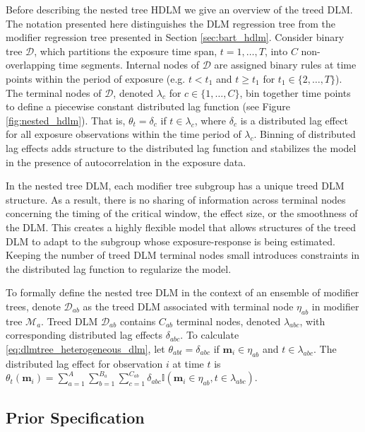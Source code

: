 \documentclass[12pt]{article}
\begin{document}
Before describing the nested tree HDLM we give an overview of the treed DLM. The notation presented here distinguishes the DLM regression tree from the modifier regression tree presented in Section \ref{sec:bart_hdlm}. Consider binary tree $\mathcal{D}$, which partitions the exposure time span, $t=1,\ldots,T$, into $C$ non-overlapping time segments. Internal nodes of $\mathcal{D}$ are assigned binary rules at time points within the period of exposure (e.g. $t<t_1$ and $t\geq t_1$ for $t_1\in\{2,\ldots,T\}$). The terminal nodes of $\mathcal{D}$, denoted $\lambda_c$ for $c\in\{1,\ldots,C\}$, bin together time points to define a piecewise constant distributed lag function (see Figure \ref{fig:nested_hdlm}). That is, $\theta_t=\delta_c$ if $t\in\lambda_c$, where $\delta_c$ is a distributed lag effect for all exposure observations within the time period of $\lambda_c$. Binning of distributed lag effects adds structure to the distributed lag function and stabilizes the model in the presence of autocorrelation in the exposure data.

In the nested tree DLM, each modifier tree subgroup has a unique treed DLM structure. As a result, there is no sharing of information across terminal nodes concerning the timing of the critical window, the effect size, or the smoothness of the DLM. This creates a highly flexible model that allows structures of the treed DLM to adapt to the subgroup whose exposure-response is being estimated. Keeping the number of treed DLM terminal nodes small introduces constraints in the distributed lag function to regularize the model.

To formally define the nested tree DLM in the context of an ensemble of modifier trees, denote $\mathcal{D}_{ab}$ as the treed DLM associated with terminal node $\eta_{ab}$ in modifier tree $\mathcal{M}_a$. Treed DLM $\mathcal{D}_{ab}$ contains $C_{ab}$ terminal nodes, denoted $\lambda_{abc}$, with corresponding distributed lag effects $\delta_{abc}$. To calculate \eqref{eq:dlmtree_heterogeneous_dlm}, let $\theta_{abt}=\delta_{abc}$ if $\mathbf{m}_i\in\eta_{ab}$ and $t\in\lambda_{abc}$. The distributed lag effect for observation $i$ at time $t$ is $\theta_t(\mathbf{m}_i)=\sum_{a=1}^A\sum_{b=1}^{B_a}\sum_{c=1}^{C_{ab}}\delta_{abc}\mathbb{I}(\mathbf{m}_i\in\eta_{ab},t\in\lambda_{abc})$.



\subsection{Prior Specification}\label{sec:prior}
\end{document}
